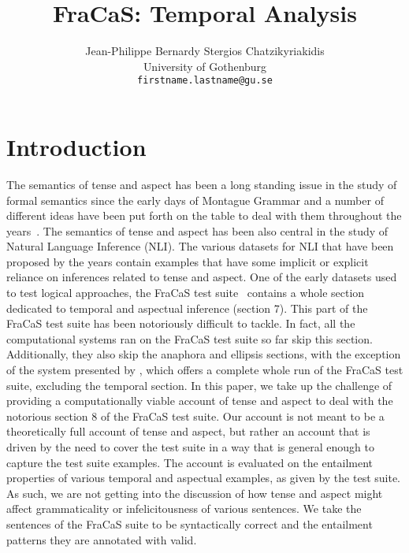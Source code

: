 \documentclass[a4paper,11pt]{article}
\title{FraCaS: Temporal Analysis}
\author{Jean-Philippe Bernardy \qquad Stergios Chatzikyriakidis \\
  University of Gothenburg\\
  {\tt firstname.lastname@gu.se} \\}
\date{}
\begin{document}
\maketitle

\section{Introduction}
\label{sec:introduction}

The semantics of tense and aspect has been a long standing issue in
the study of formal semantics since the early days of Montague Grammar
and a number of different ideas have been put forth on the table to
deal with them throughout the
years~\citep{dowty:2012,prior:2003,steedman:2000,higginbotham:2009,fernando:2015}. The
semantics of tense and aspect has been also central in the study of
Natural Language Inference (NLI). The various datasets
for NLI that have been proposed by the years contain examples that
have some implicit or explicit reliance on inferences related to tense
and aspect. One of the early datasets used to test logical approaches,
the FraCaS test suite~\citep{cooper:1996} contains a whole section
dedicated to temporal and aspectual inference (section 7). This part
of the FraCaS test suite has been notoriously difficult to tackle. In
fact, all the computational systems ran on the FraCaS test suite so
far skip this section. Additionally, they also skip the anaphora
and ellipsis sections, with the exception of the system presented by
\citet{bernardy_type_2017,bernardy_wide_2019}, which offers a complete whole run of the
FraCaS test suite, excluding the temporal section. In this
paper, we take up the challenge of providing a computationally viable
account of tense and aspect to deal with the notorious section 8 of
the FraCaS test suite. Our account is not meant to be a theoretically
full account of tense and aspect, but rather an account that is driven by the
need to cover the test suite in a way that is general enough to
capture the test suite examples. The account is evaluated on the
entailment properties of various temporal and aspectual examples, as
given by the test suite. As such, we are not getting into the
discussion of how tense and aspect might affect grammaticality or
infelicitousness of various sentences. We take the sentences of the
FraCaS suite to be syntactically correct and the entailment patterns they
are annotated with valid.
\end{document}
